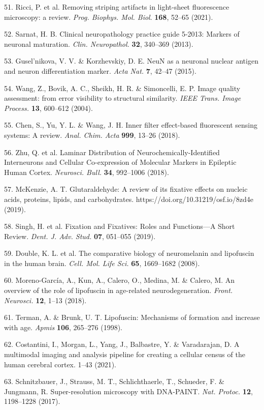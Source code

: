 \documentclass{article}
\begin{document}
\begin{hangpars}
51. Ricci, P. et al. Removing striping artifacts in light-sheet fluorescence microscopy: a review. \emph{Prog. Biophys. Mol. Biol}. \textbf{168}, 52–65 (2021).

52. Sarnat, H. B. Clinical neuropathology practice guide 5-2013: Markers of neuronal maturation. \emph{Clin. Neuropathol.} \textbf{32}, 340–369 (2013).

53. Gusel’nikova, V. V. \& Korzhevskiy, D. E. NeuN as a neuronal nuclear antigen and neuron differentiation marker. \emph{Acta Nat.} \textbf{7}, 42–47 (2015).

54. Wang, Z., Bovik, A. C., Sheikh, H. R. \& Simoncelli, E. P. Image quality assessment: from error visibility to structural similarity. \emph{IEEE Trans. Image Process.} \textbf{13}, 600–612 (2004).

55. Chen, S., Yu, Y. L. \& Wang, J. H. Inner filter effect-based fluorescent sensing systems: A review. \emph{Anal. Chim. Acta} \textbf{999}, 13–26 (2018).

56. Zhu, Q. et al. Laminar Distribution of Neurochemically-Identified Interneurons and Cellular Co-expression of Molecular Markers in Epileptic Human Cortex. \emph{Neurosci. Bull.} \textbf{34}, 992–1006 (2018).

57. McKenzie, A. T. Glutaraldehyde: A review of its fixative effects on nucleic acids, proteins, lipids, and carbohydrates. https://doi.org/10.31219/osf.io/8zd4e (2019).

58. Singh, H. et al. Fixation and Fixatives: Roles and Functions—A Short Review. \emph{Dent. J. Adv. Stud.} \textbf{07}, 051–055 (2019).

59. Double, K. L. et al. The comparative biology of neuromelanin and lipofuscin in the human brain. \emph{Cell. Mol. Life Sci.} \textbf{65}, 1669–1682 (2008).

60. Moreno-García, A., Kun, A., Calero, O., Medina, M. \& Calero, M. An overview of the role of lipofuscin in age-related neurodegeneration. \emph{Front. Neurosci.} \textbf{12}, 1–13 (2018).

61. Terman, A. \& Brunk, U. T. Lipofuscin: Mechanisms of formation and increase with age. \emph{Apmis} \textbf{106}, 265–276 (1998).

62. Costantini, I., Morgan, L., Yang, J., Balbastre, Y. \& Varadarajan, D. A multimodal imaging and analysis pipeline for creating a cellular census of the human cerebral cortex. 1–43 (2021).

63. Schnitzbauer, J., Strauss, M. T., Schlichthaerle, T., Schueder, F. \& Jungmann, R. Super-resolution microscopy with DNA-PAINT. \emph{Nat. Protoc.} \textbf{12}, 1198–1228 (2017).


\end{hangpars}
\end{document}
